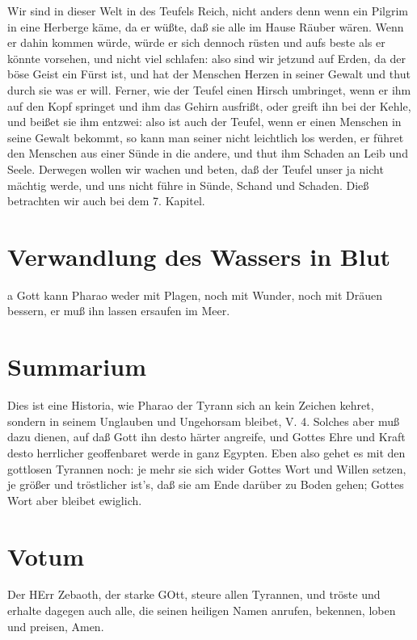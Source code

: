 Wir sind in dieser Welt in des Teufels Reich, nicht anders denn wenn ein Pilgrim in eine Herberge käme, da er wüßte, daß sie alle im Hause Räuber wären. Wenn er dahin kommen würde, würde er sich dennoch rüsten und aufs beste als er könnte vorsehen, und nicht viel schlafen: also sind wir jetzund auf Erden, da der böse Geist ein Fürst ist, und hat der Menschen Herzen in seiner Gewalt und thut durch sie was er will. Ferner, wie der Teufel einen Hirsch umbringet, wenn er ihm auf den Kopf springet und ihm das Gehirn ausfrißt, oder greift ihn bei der Kehle, und beißet sie ihm entzwei: also ist auch der Teufel, wenn er einen Menschen in seine Gewalt bekommt, so kann man seiner nicht leichtlich los werden, er führet den Menschen aus einer Sünde in die andere, und thut ihm Schaden an Leib
und Seele. Derwegen wollen wir wachen und beten, daß der Teufel unser ja nicht mächtig werde, und uns nicht führe in Sünde, Schand und Schaden. Dieß betrachten wir auch bei dem 7. Kapitel.

\section{Verwandlung des Wassers in Blut}

a Gott kann Pharao weder mit Plagen, noch mit Wunder, noch mit Dräuen bessern, er muß ihn lassen ersaufen im Meer.

\section{Summarium}

Dies ist eine Historia, wie Pharao der Tyrann sich an kein Zeichen kehret, sondern in seinem Unglauben und Ungehorsam bleibet, V. 4. Solches aber muß dazu dienen, auf daß Gott ihn desto härter angreife, und Gottes Ehre und Kraft desto herrlicher geoffenbaret werde in ganz Egypten. Eben also gehet es mit den gottlosen Tyrannen noch: je mehr sie sich wider Gottes Wort und Willen setzen, je größer und tröstlicher ist’s, daß sie am Ende darüber zu Boden gehen; Gottes Wort aber bleibet ewiglich.

\section{Votum}

Der HErr Zebaoth, der starke GOtt, steure allen Tyrannen, und tröste und erhalte dagegen auch alle, die seinen heiligen Namen anrufen, bekennen, loben und preisen, Amen.

